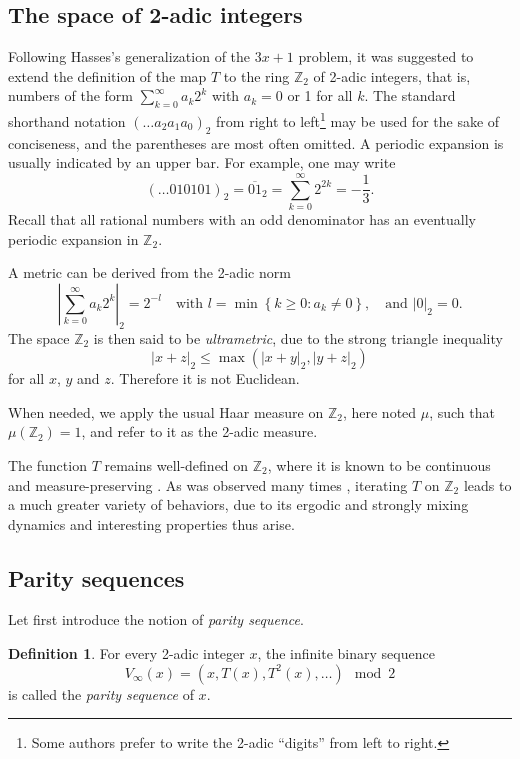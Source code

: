 \documentclass[12pt]{article}
\theoremstyle{definition}
\newtheorem{definition}{Definition}
\begin{document}
\subsection{The space of 2-adic integers}
Following Hasses's generalization of the $3x+1$ problem, it was suggested \cite{Mat84,Mol78} to extend the definition of the map $T$ to the ring $\mathbb Z_2$ of 2-adic integers, that is, numbers of the form $\sum_{k=0}^{\infty} a_{k} 2^{k}$ with $a_k = 0$ or 1 for all $k$. The standard shorthand notation $(\ldots a_{2}a_{1}a_{0})_{2}$ from right to left\footnote{Some authors prefer to write the 2-adic ``digits'' from left to right.}  may be used for the sake of conciseness, and the parentheses are most often omitted. A periodic expansion is usually indicated by an upper bar. For example, one may write 
$$ (\ldots010101)_2 = \overline{01}_2 = \sum_{k=0}^{\infty}  2^{2k} = -\frac{1}{3}.$$
Recall that all rational numbers with an odd denominator has an eventually periodic  expansion in $\mathbb Z_2$.
 
A metric can be derived from the 2-adic norm
$$ \left|\sum_{k=0}^{\infty} a_{k} 2^{k}\right|_2 = 2^{-l} \quad \text{with } l=\min \left\lbrace k \geq 0: a_k \neq 0 \right\rbrace, \quad \text{and } |0|_2=0.$$
The space $\mathbb Z_2$ is then said to be \textit{ultrametric}, due to the strong triangle inequality $$|x+z|_2 \leq \max\left( |x+y|_2 , |y+z|_2 \right)$$ for all $x$, $y$ and $z$. Therefore it is not Euclidean.

When needed, we apply the usual Haar measure on $\mathbb Z_2$, here noted $\mu$, such that $\mu(\mathbb Z_2)=1$, and refer to it as the 2-adic measure.

The function $T$ remains well-defined on $\mathbb Z_2$, where it is known to be continuous and measure-preserving \cite{Mat84}. As was observed many times \cite{Aki04, Lag90, Mon04}, iterating $T$ on $\mathbb Z_2$ leads to a much greater variety of behaviors, due to its ergodic and strongly mixing dynamics \cite{Mat84} and interesting properties thus arise.

\subsection{Parity sequences}
\label{sub:parseq}
Let first introduce the notion of \textit{parity sequence}.

\begin{definition} \label{def:V_inf}
For every 2-adic integer $x$, the infinite binary sequence 
\begin{equation} \label{eq:V_inf}
V_{\infty}(x) = \left(  x, T(x), T^{2}(x), \ldots \right)   \mod 2
\end{equation}
is called the {\em parity sequence} of $x$.
\end{definition}
\end{document}
